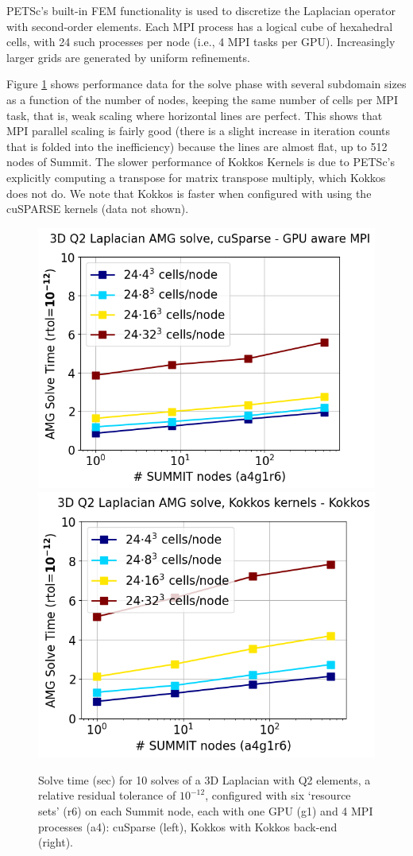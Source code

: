 \documentclass[5p,times]{elsarticle}
\begin{document}
PETSc's built-in FEM functionality is used to discretize the Laplacian operator with second-order elements.
Each MPI process has a logical cube of hexahedral cells, with 24 such processes per node (i.e., 4 MPI tasks per GPU).
Increasingly larger grids are generated by uniform refinements.

Figure \ref{fig:gamg_weak_scaling} shows performance data for the solve phase with several subdomain sizes as a function of the number of nodes, keeping the same number of cells per MPI task, that is, weak scaling where horizontal lines are perfect.
This shows that MPI parallel scaling is fairly good (there is a slight increase in iteration counts that is folded into the inefficiency) because the lines are almost flat, up to 512 nodes of Summit.
The slower performance of Kokkos Kernels is due to PETSc's explicitly computing a transpose for matrix transpose multiply, which Kokkos does not do.
We note that Kokkos is faster when configured with using the cuSPARSE kernels (data not shown).

\begin{figure}[htbp]
\begin{center}
\includegraphics[width=.49\linewidth]{weak_scaling_cuda_def_a4g1r6.png}
\includegraphics[width=.49\linewidth]{weak_scaling_kokkos_notpl_a4g1r6.png}
\caption{Solve time (sec) for 10 solves of a 3D Laplacian with Q2 elements, a relative residual tolerance of $10^{-12}$, configured with six  `resource sets' (r6) on each Summit node, each with one GPU (g1) and 4 MPI processes (a4): cuSparse (left), Kokkos with Kokkos back-end (right).}
\label{fig:gamg_weak_scaling}
\end{center}
\end{figure}
\end{document}
